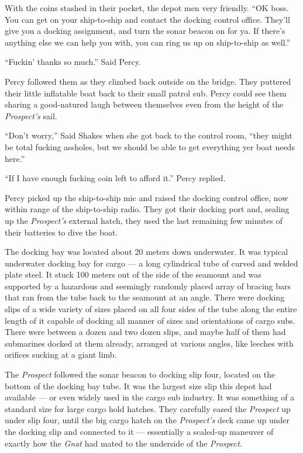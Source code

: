 \documentclass[]{scrbook}
\begin{document}
With the coins stashed in their pocket, the depot men very friendly.
``OK boss. You can get on your ship-to-ship and contact the docking
control office. They'll give you a docking assignment, and turn the
sonar beacon on for ya. If there's anything else we can help you with,
you can ring us up on ship-to-ship as well.''

``Fuckin' thanks so much.'' Said Percy.

Percy followed them as they climbed back outside on the bridge. They
puttered their little inflatable boat back to their small patrol sub.
Percy could see them sharing a good-natured laugh between themselves
even from the height of the \emph{Prospect's} sail.

``Don't worry,'' Said Shakes when she got back to the control room,
``they might be total fucking assholes, but we should be able to get
everything yer boat needs here.''

``If I have enough fucking coin left to afford it.'' Percy replied.

Percy picked up the ship-to-ship mic and raised the docking control
office, now within range of the ship-to-ship radio. They got their
docking port and, sealing up the \emph{Prospect's} external hatch, they
used the last remaining few minutes of their batteries to dive the boat.

The docking bay was located about 20 meters down underwater. It was
typical underwater docking bay for cargo --- a long cylindrical tube of
curved and welded plate steel. It stuck 100 meters out of the side of
the seamount and was supported by a hazardous and seemingly randomly
placed array of bracing bars that ran from the tube back to the seamount
at an angle. There were docking slips of a wide variety of sizes placed
on all four sides of the tube along the entire length of it capable of
docking all manner of sizes and orientations of cargo subs. There were
between a dozen and two dozen slips, and maybe half of them had
submarines docked at them already, arranged at various angles, like
leeches with orifices sucking at a giant limb.

The \emph{Prospect} followed the sonar beacon to docking slip four,
located on the bottom of the docking bay tube. It was the largest size
slip this depot had available --- or even widely used in the cargo sub
industry. It was something of a standard size for large cargo hold
hatches. They carefully eased the \emph{Prospect} up under slip four,
until the big cargo hatch on the \emph{Prospect's} deck came up under
the docking slip and connected to it --- essentially a scaled-up
maneuver of exactly how the \emph{Gnat} had mated to the underside of
the \emph{Prospect}.
\end{document}
